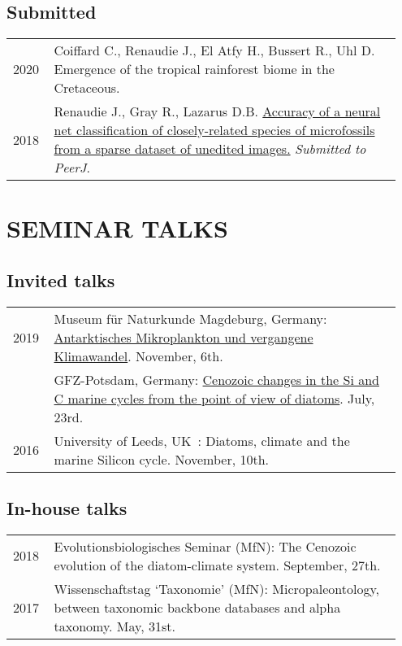 \documentclass[11pt, a4paper]{article}
\begin{document}
\subsection{Submitted}
\begin{longtable}{p{0.1\linewidth} P{0.85\linewidth}}
2020 %
 & Coiffard C., Renaudie J., El Atfy H., Bussert R., Uhl D. Emergence of the tropical rainforest biome in the Cretaceous.\\
2018 & Renaudie J., Gray R., Lazarus D.B. \href{https://peerj.com/preprints/27328/}{Accuracy of a neural net classification of closely-related species of microfossils from a sparse dataset of unedited images.} \textit{Submitted to PeerJ}.\\
\end{longtable}

\section{SEMINAR TALKS}
\subsection{Invited talks}
\begin{longtable}{p{0.1\linewidth} P{0.85\linewidth}}
2019 & Museum f\"{u}r Naturkunde Magdeburg, Germany: \href{http://www.naturkundemuseum-magdeburg.de/data/mediapool/qprgm004-2019-web.pdf}{Antarktisches Mikroplankton und vergangene Klimawandel}. November, 6th.\\
 & GFZ-Potsdam, Germany: \href{http://plannapus.github.io/data/20190723Potsdam.pdf}{Cenozoic changes in the Si and C marine cycles from the point of view of diatoms}. July, 23rd.\\
2016 & University of Leeds, UK : Diatoms, climate and the marine Silicon cycle. November, 10th.\\
\end{longtable}
\subsection{In-house talks}
\begin{longtable}{p{0.1\linewidth} P{0.85\linewidth}}
2018 & Evolutionsbiologisches Seminar (MfN): The Cenozoic evolution of the diatom-climate system. September, 27th.\\
2017 & Wissenschaftstag `Taxonomie' (MfN): Micropaleontology, between taxonomic backbone databases and alpha taxonomy. May, 31st.\\
\end{longtable}
\end{document}
